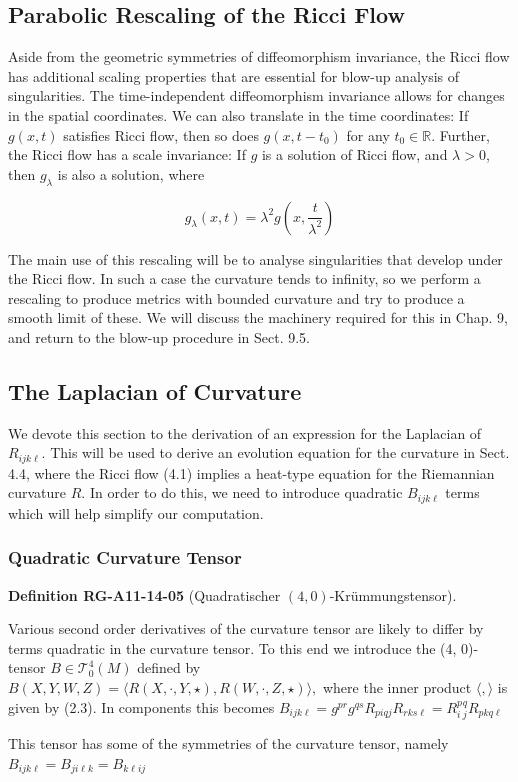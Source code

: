 \documentclass[10pt, letterpaper]{article}
\newcommand{\CustomHeading}[3]{%
  \par\medskip\noindent%
  \textbf{#1 #2} \textnormal{(#3)}.\enskip%
}
\newenvironment{DEF}[2]{\begin{unitbox}\CustomHeading{Definition}{#1}{#2}}{\end{unitbox}}
\begin{document}
\pagebreak

\subsection*{Parabolic Rescaling of the Ricci Flow}
Aside from the geometric symmetries of diffeomorphism invariance, the Ricci flow has additional scaling properties that are essential for blow-up analysis of singularities. The time-independent diffeomorphism invariance allows for changes in the spatial coordinates. We can also translate in the time coordinates: If $g(x, t)$ satisfies Ricci flow, then so does $g\left(x, t-t_{0}\right)$ for any $t_{0} \in \mathbb{R}$. Further, the Ricci flow has a scale invariance: If $g$ is a solution of Ricci flow, and $\lambda>0$, then $g_{\lambda}$ is also a solution, where

$$
g_{\lambda}(x, t)=\lambda^{2} g\left(x, \frac{t}{\lambda^{2}}\right)
$$

The main use of this rescaling will be to analyse singularities that develop under the Ricci flow. In such a case the curvature tends to infinity, so we perform a rescaling to produce metrics with bounded curvature and try to produce a smooth limit of these. We will discuss the machinery required for this in Chap. 9, and return to the blow-up procedure in Sect. 9.5.



\pagebreak

\subsection*{The Laplacian of Curvature}

We devote this section to the derivation of an expression for the Laplacian of $R_{i j k \ell}$. This will be used to derive an evolution equation for the curvature in Sect. 4.4, where the Ricci flow (4.1) implies a heat-type equation for the Riemannian curvature $R$. In order to do this, we need to introduce quadratic $B_{i j k \ell}$ terms which will help simplify our computation.


\subsubsection*{Quadratic Curvature Tensor}


\begin{DEF}{RG-A11-14-05}{Quadratischer $(4,0)$-Krümmungstensor}
Various second order derivatives of the curvature tensor are likely to differ by terms quadratic in the curvature tensor. To this end we introduce the (4, 0)-tensor $B \in \mathscr{T}_{0}^{4}(M)$ defined by
$
B(X, Y, W, Z)=\langle R(X, \cdot, Y, \star), R(W, \cdot, Z, \star)\rangle,
$
where the inner product $\langle,\rangle$ is given by (2.3). 
In components this becomes
$
B_{i j k \ell}=g^{p r} g^{q s} R_{p i q j} R_{r k s \ell}=R_{i}^{p}{ }_{j}^{q} R_{p k q \ell}
$


This tensor has some of the symmetries of the curvature tensor, namely
$
B_{i j k \ell}=B_{j i \ell k}=B_{k \ell i j}
$
\end{DEF}
\end{document}
